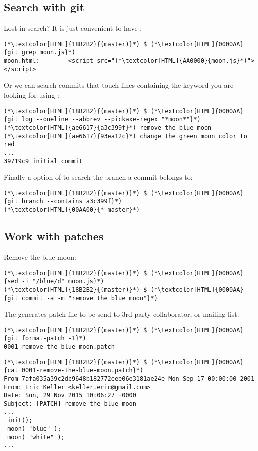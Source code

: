 \subsection{Search with git}
\begin{frame}[fragile]
  \subslidetitle
  Lost in search? It is just convenient to have :
  \begin{lstlisting}
(*\textcolor[HTML]{18B2B2}{(master)}*) $ (*\textcolor[HTML]{0000AA}{git grep moon.js}*)
moon.html:        <script src="(*\textcolor[HTML]{AA0000}{moon.js}*)"></script>
\end{lstlisting}

  Or we can search commits that touch lines containing the keyword you are looking for using :
  \begin{lstlisting}
(*\textcolor[HTML]{18B2B2}{(master)}*) $ (*\textcolor[HTML]{0000AA}{git log --oneline --abbrev --pickaxe-regex "*moon*"}*)
(*\textcolor[HTML]{ae6617}{a3c399f}*) remove the blue moon
(*\textcolor[HTML]{ae6617}{93ea12c}*) change the green moon color to red
...
39719c9 initial commit
\end{lstlisting}

  Finally a option of  to search the branch a commit belongs to:
  \begin{lstlisting}
(*\textcolor[HTML]{18B2B2}{(master)}*) $ (*\textcolor[HTML]{0000AA}{git branch --contains a3c399f}*)
(*\textcolor[HTML]{00AA00}{* master}*)
\end{lstlisting}
\end{frame}

\subsection{Work with patches}
\begin{frame}[fragile]
    \subslidetitle

  Remove the blue moon:
  \begin{lstlisting}
(*\textcolor[HTML]{18B2B2}{(master)}*) $ (*\textcolor[HTML]{0000AA}{sed -i "/blue/d" moon.js}*)
(*\textcolor[HTML]{18B2B2}{(master)}*) $ (*\textcolor[HTML]{0000AA}{git commit -a -m "remove the blue moon"}*)
\end{lstlisting}

  The  generates patch file to be send to 3rd party collaborator, or mailing list:
  \begin{lstlisting}
(*\textcolor[HTML]{18B2B2}{(master)}*) $ (*\textcolor[HTML]{0000AA}{git format-patch -1}*)
0001-remove-the-blue-moon.patch
\end{lstlisting}

  \begin{lstlisting}
(*\textcolor[HTML]{18B2B2}{(master)}*) $ (*\textcolor[HTML]{0000AA}{cat 0001-remove-the-blue-moon.patch}*)
From 7afa035a39c2dc9648b182772eee06e3181ae24e Mon Sep 17 00:00:00 2001
From: Eric Keller <keller.eric@gmail.com>
Date: Sun, 29 Nov 2015 10:06:27 +0000
Subject: [PATCH] remove the blue moon
...
 init();
-moon( "blue" );
 moon( "white" );
...
\end{lstlisting}

\end{frame}

